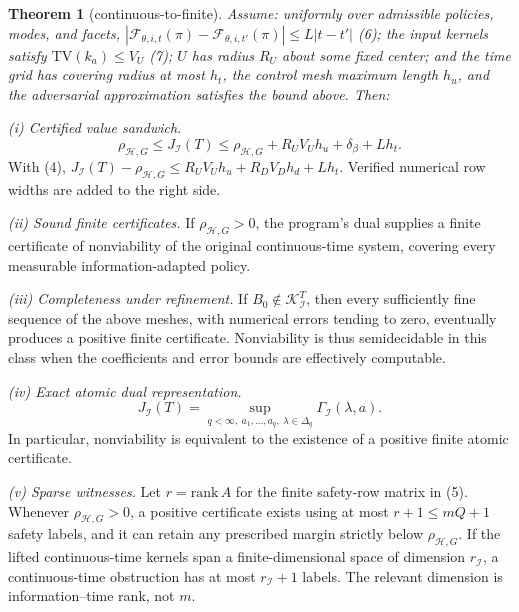 \documentclass[10pt,twocolumn]{article}
\theoremstyle{plain}
\newtheorem{theorem}{Theorem}
\theoremstyle{definition}
\theoremstyle{remark}
\begin{document}
\begin{theorem}[continuous-to-finite]\label{thm:bridge}
Assume: uniformly over admissible policies, modes, and facets,
\(|\mathcal{F}_{\theta,i,t}(\pi) - \mathcal{F}_{\theta,i,t'}(\pi)| \le
L|t - t'|\) (6); the input kernels satisfy \(\mathrm{TV}(k_a) \le V_U\) (7);
\(U\) has radius \(R_U\) about some fixed center; and the time grid has
covering radius at most \(h_t\), the control mesh maximum length \(h_u\),
and the adversarial approximation satisfies the bound above. Then:
\end{theorem}

\noindent\emph{(i) Certified value sandwich.}
\[
\rho_{\mathcal{H},G} \le J_{\mathcal{I}}(T) \le \rho_{\mathcal{H},G}
+ R_U V_U h_u + \delta_\beta + L h_t.
\tag{8}
\]
With (4), \(J_{\mathcal{I}}(T) - \rho_{\mathcal{H},G} \le R_U V_U h_u + R_D
V_D h_d + L h_t\). Verified numerical row widths are added to the right side.

\noindent\emph{(ii) Sound finite certificates.} If \(\rho_{\mathcal{H},G} > 0\), the
program's dual supplies a finite certificate of nonviability of the original
continuous-time system, covering every measurable information-adapted policy.

\noindent\emph{(iii) Completeness under refinement.} If
\(B_0 \notin \mathcal{K}_{\mathcal{I}}^T\), then every sufficiently fine
sequence of the above meshes, with numerical errors tending to zero,
eventually produces a positive finite certificate. Nonviability is thus
semidecidable in this class when the coefficients and error bounds are
effectively computable.

\noindent\emph{(iv) Exact atomic dual representation.}
\[
J_{\mathcal{I}}(T) = \sup_{q < \infty,\ a_1,\dots,a_q,\
\lambda \in \Delta_q} \Gamma_{\mathcal{I}}(\lambda, a).
\tag{9}
\]
In particular, nonviability is equivalent to the existence of a positive
finite atomic certificate.

\noindent\emph{(v) Sparse witnesses.} Let \(r = \mathrm{rank}\, A\) for the
finite safety-row matrix in (5). Whenever \(\rho_{\mathcal{H},G} > 0\), a
positive certificate exists using at most \(r + 1 \le mQ + 1\) safety labels,
and it can retain any prescribed margin strictly below
\(\rho_{\mathcal{H},G}\). If the lifted continuous-time kernels span a
finite-dimensional space of dimension \(r_{\mathcal{I}}\), a continuous-time
obstruction has at most \(r_{\mathcal{I}} + 1\) labels. The relevant
dimension is information--time rank, not \(m\).
\end{document}
